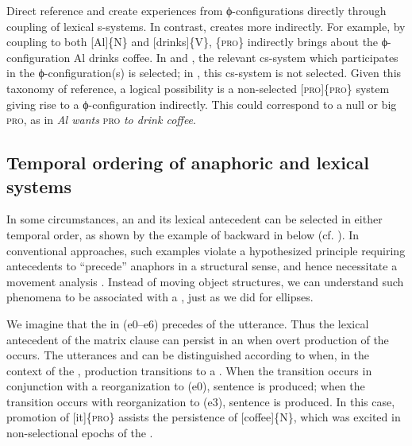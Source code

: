 Direct reference and  create  experiences from ϕ-con\-fig\-u\-ra\-tions directly through coupling of lexical s-systems. In contrast,  creates  more indirectly. For example, by coupling to both [Al]\{N\} and [drinks]\{V\}, \{\textsc{pro}\} indirectly brings about the ϕ-con\-fig\-u\-ra\-tion {\textbar}Al drinks coffee{\textbar}. In  and , the relevant cs-system which participates in the ϕ-con\-fig\-u\-ra\-tion(s) is selected; in , this cs-system is not selected. Given this taxonomy of reference, a logical possibility is a non-selected [\textsc{pro}]\{\textsc{pro}\} system giving rise to a ϕ-con\-fig\-u\-ra\-tion indirectly. This could correspond to a null  or big \textsc{pro}, as in \textit{Al wants} \textsc{pro} \textit{to drink coffee}.

\subsection{Temporal ordering of anaphoric and lexical systems}

In some circumstances, an  and its lexical antecedent can be selected in either temporal order, as shown by the example of backward  in  below (cf. \citealt{KazaninaEtAl2007,ReulandAvrutin2005}). In conventional approaches, such examples violate a hypothesized principle requiring antecedents to “precede” anaphors in a structural sense, and hence necessitate a movement analysis \citep{Chomsky1993}. Instead of moving object structures, we can understand such phenomena to be associated with a , just as we did for ellipses.

  We imagine that the  in {} (e0--e6) precedes  of the utterance. Thus the lexical antecedent of the matrix clause can persist in an  when overt production of the  occurs. The utterances  and  can be distinguished according to when, in the context of the , production transitions to a . When the transition occurs in conjunction with a reorganization to (e0), sentence  is produced; when the transition occurs with reorganization to (e3), sentence  is produced. In this case, promotion of [it]\{\textsc{pro}\} assists the persistence of [coffee]\{N\}, which was excited in non-selectional epochs of the .

